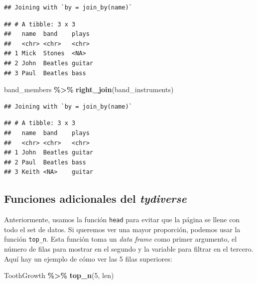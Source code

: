 \documentclass[
]{book}
\newenvironment{Shaded}{\begin{snugshade}}{\end{snugshade}}
\newcommand{\DecValTok}[1]{\textcolor[rgb]{0.00,0.00,0.81}{#1}}
\newcommand{\FunctionTok}[1]{\textcolor[rgb]{0.13,0.29,0.53}{\textbf{#1}}}
\newcommand{\NormalTok}[1]{#1}
\newcommand{\SpecialCharTok}[1]{\textcolor[rgb]{0.81,0.36,0.00}{\textbf{#1}}}
\begin{document}
\begin{verbatim}
## Joining with `by = join_by(name)`
\end{verbatim}

\begin{verbatim}
## # A tibble: 3 x 3
##   name  band    plays 
##   <chr> <chr>   <chr> 
## 1 Mick  Stones  <NA>  
## 2 John  Beatles guitar
## 3 Paul  Beatles bass
\end{verbatim}

\begin{Shaded}
\begin{Highlighting}[]
\NormalTok{band\_members }\SpecialCharTok{\%\textgreater{}\%} \FunctionTok{right\_join}\NormalTok{(band\_instruments)}
\end{Highlighting}
\end{Shaded}

\begin{verbatim}
## Joining with `by = join_by(name)`
\end{verbatim}

\begin{verbatim}
## # A tibble: 3 x 3
##   name  band    plays 
##   <chr> <chr>   <chr> 
## 1 John  Beatles guitar
## 2 Paul  Beatles bass  
## 3 Keith <NA>    guitar
\end{verbatim}

\subsection{\texorpdfstring{Funciones adicionales del \emph{tydiverse}}{Funciones adicionales del tydiverse}}\label{funciones-adicionales-del-tydiverse}

\hfill\break
Anteriormente, usamos la función \texttt{head} para evitar que la página se llene con todo el set de datos.
Si queremos ver una mayor proporción, podemos usar la función \texttt{top\_n}.
Esta función toma un \emph{data frame} como primer argumento, el número de filas para mostrar en el segundo y la variable para filtrar en el tercero.
Aquí hay un ejemplo de cómo ver las 5 filas superiores:\\

\begin{Shaded}
\begin{Highlighting}[]
\NormalTok{ToothGrowth }\SpecialCharTok{\%\textgreater{}\%} \FunctionTok{top\_n}\NormalTok{(}\DecValTok{5}\NormalTok{, len)}
\end{Highlighting}
\end{Shaded}
\end{document}

